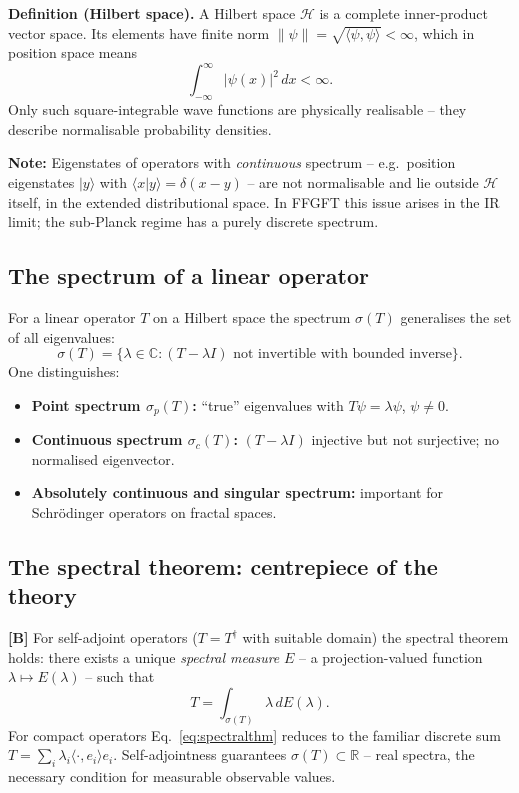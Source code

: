\textbf{Definition (Hilbert space).}
A Hilbert space $\mathcal{H}$ is a complete inner-product vector space.
Its elements have finite norm $\|\psi\| = \sqrt{\langle\psi,\psi\rangle}
< \infty$, which in position space means
\begin{equation}
  \int_{-\infty}^{\infty} |\psi(x)|^2 \, dx < \infty.
\end{equation}
Only such square-integrable wave functions are physically realisable --
they describe normalisable probability densities.

\textbf{Note:} Eigenstates of operators with \emph{continuous} spectrum
-- e.g.\ position eigenstates $|y\rangle$ with $\langle x|y\rangle =
\delta(x-y)$ -- are not normalisable and lie outside $\mathcal{H}$
itself, in the extended distributional space. In FFGFT this issue
arises in the IR limit; the sub-Planck regime has a purely discrete
spectrum.

\subsection{The spectrum of a linear operator}

For a linear operator $T$ on a Hilbert space the spectrum $\sigma(T)$
generalises the set of all eigenvalues:
\begin{equation}
  \sigma(T) = \{\lambda \in \mathbb{C} : (T - \lambda I)
  \text{ not invertible with bounded inverse}\}.
\end{equation}
One distinguishes:
\begin{itemize}
  \item \textbf{Point spectrum $\sigma_p(T)$:} ``true'' eigenvalues
    with $T\psi = \lambda\psi$, $\psi \neq 0$.
  \item \textbf{Continuous spectrum $\sigma_c(T)$:}
    $(T-\lambda I)$ injective but not surjective; no normalised
    eigenvector.
  \item \textbf{Absolutely continuous and singular spectrum:}
    important for Schr\"{o}dinger operators on fractal spaces.
\end{itemize}

\subsection{The spectral theorem: centrepiece of the theory}

\textbf{[B]} For self-adjoint operators ($T = T^\dagger$ with suitable
domain) the spectral theorem holds: there exists a unique
\emph{spectral measure} $E$ -- a projection-valued function
$\lambda \mapsto E(\lambda)$ -- such that
\begin{equation}
  T = \int_{\sigma(T)} \lambda \, dE(\lambda).
  \label{eq:spectralthm}
\end{equation}
For compact operators Eq.~\eqref{eq:spectralthm} reduces to the
familiar discrete sum $T = \sum_i \lambda_i \langle\cdot, e_i\rangle e_i$.
Self-adjointness guarantees $\sigma(T) \subset \mathbb{R}$ -- real
spectra, the necessary condition for measurable observable values.

